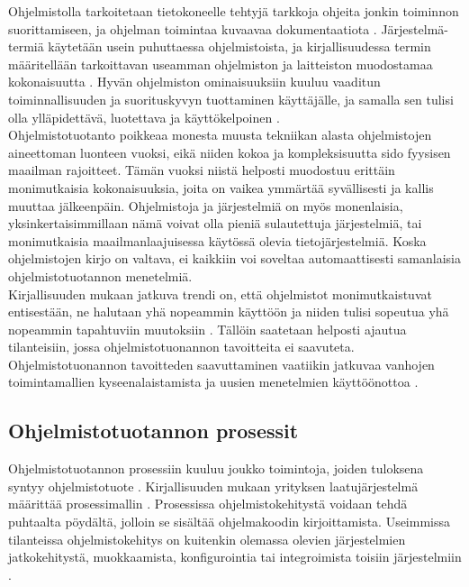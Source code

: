 \documentclass[finnish,12pt,a4paper,pdftex]{article}
\begin{document}
Ohjelmistolla tarkoitetaan tietokoneelle tehtyjä tarkkoja ohjeita jonkin toiminnon suorittamiseen, ja ohjelman toimintaa kuvaavaa dokumentaatiota \citep{sommerville}. Järjestelmä-termiä käytetään usein puhuttaessa ohjelmistoista, ja kirjallisuudessa termin määritellään tarkoittavan useamman ohjelmiston ja laitteiston muodostamaa kokonaisuutta \citep{okaytannot}. Hyvän ohjelmiston ominaisuuksiin kuuluu vaaditun toiminnallisuuden ja suorituskyvyn tuottaminen käyttäjälle, ja samalla sen tulisi olla ylläpidettävä, luotettava ja käyttökelpoinen \citep{sommerville}.\\

\noindent Ohjelmistotuotanto poikkeaa monesta muusta tekniikan alasta ohjelmistojen aineettoman luonteen vuoksi, eikä niiden kokoa ja kompleksisuutta sido fyysisen maailman rajoitteet. Tämän vuoksi niistä helposti muodostuu erittäin monimutkaisia kokonaisuuksia, joita on vaikea ymmärtää syvällisesti ja kallis muuttaa jälkeenpäin. Ohjelmistoja ja järjestelmiä on myös monenlaisia, yksinkertaisimmillaan nämä voivat olla pieniä sulautettuja järjestelmiä, tai monimutkaisia maailmanlaajuisessa käytössä olevia tietojärjestelmiä. Koska ohjelmistojen kirjo on valtava, ei kaikkiin voi soveltaa automaattisesti samanlaisia ohjelmistotuotannon menetelmiä. \citep{sommerville}\\

\noindent Kirjallisuuden mukaan jatkuva trendi on, että ohjelmistot monimutkaistuvat entisestään, ne halutaan yhä nopeammin käyttöön ja niiden tulisi sopeutua yhä nopeammin tapahtuviin muutoksiin \citep{sommerville}. Tällöin saatetaan helposti ajautua tilanteisiin, jossa ohjelmistotuonannon tavoitteita ei saavuteta. Ohjelmistotuonannon tavoitteden saavuttaminen vaatiikin jatkuvaa vanhojen toimintamallien kyseenalaistamista ja uusien menetelmien käyttöönottoa \citep{okaytannot}. \\

\subsection{Ohjelmistotuotannon prosessit}

Ohjelmistotuotannon prosessiin kuuluu joukko toimintoja, joiden tuloksena syntyy ohjelmistotuote \citep{sommerville}. Kirjallisuuden mukaan yrityksen laatujärjestelmä määrittää prosessimallin \citep{okaytannot}. Prosessissa ohjelmistokehitystä voidaan tehdä puhtaalta pöydältä, jolloin se sisältää ohjelmakoodin kirjoittamista. Useimmissa tilanteissa ohjelmistokehitys on kuitenkin olemassa olevien järjestelmien jatkokehitystä, muokkaamista, konfigurointia tai integroimista toisiin järjestelmiin \citep{sommerville}. \\
\end{document}
